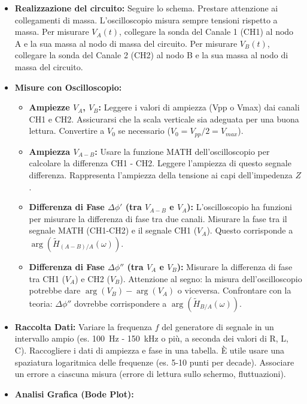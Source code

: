 \documentclass[a4paper, 11pt]{article}
\newcommand{\argum}[1]{\arg\left(#1\right)}
\begin{document}
\begin{itemize}
    \item \textbf{Realizzazione del circuito:} Seguire lo schema. Prestare attenzione ai collegamenti di massa. L'oscilloscopio misura sempre tensioni rispetto a massa. Per misurare $V_A(t)$, collegare la sonda del Canale 1 (CH1) al nodo A e la sua massa al nodo di massa del circuito. Per misurare $V_B(t)$, collegare la sonda del Canale 2 (CH2) al nodo B e la sua massa al nodo di massa del circuito.
    \item \textbf{Misure con Oscilloscopio:}
        \begin{itemize}
            \item \textbf{Ampiezze $V_A$, $V_B$:} Leggere i valori di ampiezza (Vpp o Vmax) dai canali CH1 e CH2. Assicurarsi che la scala verticale sia adeguata per una buona lettura. Convertire a $V_0$ se necessario ($V_0 = V_{pp}/2 = V_{max}$).
            \item \textbf{Ampiezza $V_{A-B}$:} Usare la funzione MATH dell'oscilloscopio per calcolare la differenza CH1 - CH2. Leggere l'ampiezza di questo segnale differenza. Rappresenta l'ampiezza della tensione ai capi dell'impedenza $Z$.
            \item \textbf{Differenza di Fase $\Delta\phi'$ (tra $V_{A-B}$ e $V_A$):} L'oscilloscopio ha funzioni per misurare la differenza di fase tra due canali. Misurare la fase tra il segnale MATH (CH1-CH2) e il segnale CH1 ($V_A$). Questo corrisponde a $\argum{\tilde{H}_{(A-B)/A}(\omega)}$.
            \item \textbf{Differenza di Fase $\Delta\phi''$ (tra $V_A$ e $V_B$):} Misurare la differenza di fase tra CH1 ($V_A$) e CH2 ($V_B$). Attenzione al segno: la misura dell'oscilloscopio potrebbe dare $\argum{V_B} - \argum{V_A}$ o viceversa. Confrontare con la teoria: $\Delta\phi''$ dovrebbe corrispondere a $\argum{\tilde{H}_{B/A}(\omega)}$.
        \end{itemize}
    \item \textbf{Raccolta Dati:} Variare la frequenza $f$ del generatore di segnale in un intervallo ampio (es. \SI{100}{Hz} - \SI{150}{kHz} o più, a seconda dei valori di R, L, C). Raccogliere i dati di ampiezza e fase in una tabella. È utile usare una spaziatura logaritmica delle frequenze (es. 5-10 punti per decade). Associare un errore a ciascuna misura (errore di lettura sullo schermo, fluttuazioni).
    \item \textbf{Analisi Grafica (Bode Plot):}
        \begin{itemize}

\end{itemize}
\end{itemize}
\end{document}
